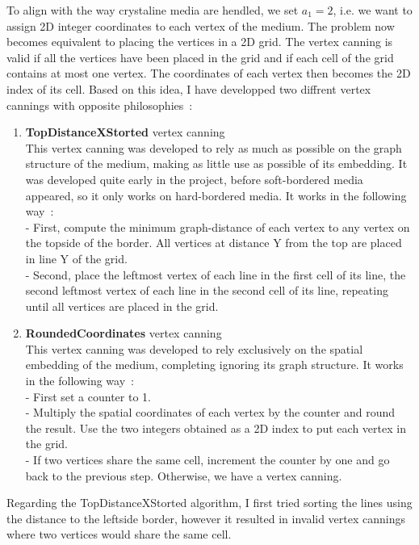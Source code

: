 \documentclass{article}
\begin{document}
To align with the way crystaline media are hendled, we set $a_1 = 2$, i.e. we want to assign 2D integer coordinates to each vertex of the medium. The problem now becomes equivalent to placing the vertices in a 2D grid. The vertex canning is valid if all the vertices have been placed in the grid and if each cell of the grid contains at most one vertex. The coordinates of each vertex then becomes the 2D index of its cell. Based on this idea, I have developped two diffrent vertex cannings with opposite philosophies~:
\begin{enumerate}
	\item \textbf{TopDistanceXStorted} vertex canning\\
	This vertex canning was developed to rely as much as possible on the graph structure of the medium, making as little use as possible of its embedding. It was developed quite early in the project, before soft-bordered media appeared, so it only works on hard-bordered media. It works in the following way~:\\
	- First, compute the minimum graph-distance of each vertex to any vertex on the topside of the border. All vertices at distance Y from the top are placed in line Y of the grid.\\
	- Second, place the leftmost vertex of each line in the first cell of its line, the second leftmost vertex of each line in the second cell of its line, repeating until all vertices are placed in the grid.
	
	\item \textbf{RoundedCoordinates} vertex canning\\
	This vertex canning was developed to rely exclusively on the spatial embedding of the medium, completing ignoring its graph structure. It works in the following way~:\\
	- First set a counter to 1.\\
	- Multiply the spatial coordinates of each vertex by the counter and round the result. Use the two integers obtained as a 2D index to put each vertex in the grid.\\
	- If two vertices share the same cell, increment the counter by one and go back to the previous step. Otherwise, we have a vertex canning.
\end{enumerate}

Regarding the TopDistanceXStorted algorithm, I first tried sorting the lines using the distance to the leftside border, however it resulted in invalid vertex cannings where two vertices would share the same cell.
\end{document}
